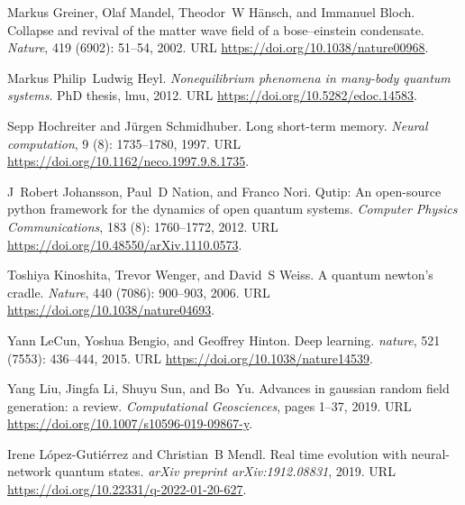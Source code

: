 \documentclass[a4paper,aps,amsmath,amssymb,twocolumn,longbibliography,,accepted=2022-05-17]{quantumarticle}
\begin{document}
\begin{thebibliography}{52}
Markus Greiner, Olaf Mandel, Theodor~W H{\"a}nsch, and Immanuel Bloch.
\newblock Collapse and revival of the matter wave field of a bose--einstein
  condensate.
\newblock \emph{Nature}, 419 (6902): 51--54, 2002.
\newblock URL \url{https://doi.org/10.1038/nature00968}.

Markus Philip~Ludwig Heyl.
\newblock \emph{Nonequilibrium phenomena in many-body quantum systems}.
\newblock PhD thesis, lmu, 2012.
\newblock URL \url{https://doi.org/10.5282/edoc.14583}.

Sepp Hochreiter and J{\"u}rgen Schmidhuber.
\newblock Long short-term memory.
\newblock \emph{Neural computation}, 9 (8): 1735--1780, 1997.
\newblock URL \url{https://doi.org/10.1162/neco.1997.9.8.1735}.

J~Robert Johansson, Paul~D Nation, and Franco Nori.
\newblock Qutip: An open-source python framework for the dynamics of open
  quantum systems.
\newblock \emph{Computer Physics Communications}, 183 (8):
  1760--1772, 2012.
\newblock URL \url{https://doi.org/10.48550/arXiv.1110.0573}.

Toshiya Kinoshita, Trevor Wenger, and David~S Weiss.
\newblock A quantum newton's cradle.
\newblock \emph{Nature}, 440 (7086): 900--903, 2006.
\newblock URL \url{https://doi.org/10.1038/nature04693}.

Yann LeCun, Yoshua Bengio, and Geoffrey Hinton.
\newblock Deep learning.
\newblock \emph{nature}, 521 (7553): 436--444, 2015.
\newblock URL \url{https://doi.org/10.1038/nature14539}.

Yang Liu, Jingfa Li, Shuyu Sun, and Bo~Yu.
\newblock Advances in gaussian random field generation: a review.
\newblock \emph{Computational Geosciences}, pages 1--37, 2019.
\newblock URL \url{https://doi.org/10.1007/s10596-019-09867-y}.

Irene L{\'o}pez-Guti{\'e}rrez and Christian~B Mendl.
\newblock Real time evolution with neural-network quantum states.
\newblock \emph{arXiv preprint arXiv:1912.08831}, 2019.
\newblock URL \url{https://doi.org/10.22331/q-2022-01-20-627}.


\end{thebibliography}
\end{document}
